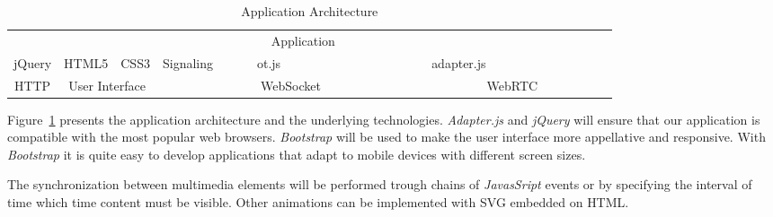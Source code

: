 \begin{table}[H]
\centering
	\caption{Application Architecture}
	\label{table:apparch}
    \begin{tabular}{cccccccc@{}m{0pt}@{}}
	\hline 
\multicolumn{8}{|c|}{\cellcolor{Gray}Application}  &\\[12pt]\cline{1-5}\cline{7-7}
\multicolumn{1}{|c|}{jQuery} & \multicolumn{1}{c|}{HTML5} & \multicolumn{1}{c|}{CSS3} & \multicolumn{1}{c|}{Signaling} & \multicolumn{1}{c|}{~~~~~ot.js~~~~~} & \multicolumn{1}{c|}{\cellcolor{Gray}~~~~~~~~~~~~~~~} & \multicolumn{1}{c|}{adapter.js} &   \multicolumn{1}{c|}{\cellcolor{Gray}~~~~~~~~~~~~~~~} &\\[12pt]\hline
\multicolumn{1}{|c|}{HTTP} & \multicolumn{2}{c|}{User Interface}  & \multicolumn{3}{c|}{WebSocket}    & \multicolumn{2}{c|}{WebRTC}      &\\[12pt]\hline
\end{tabular}
	        \label{fig:apparch}
\end{table}

Figure~\ref{fig:apparch} presents the application architecture and the underlying technologies. \emph{Adapter.js} and \emph{jQuery} will ensure that our application is compatible with the most popular web browsers.
\emph{Bootstrap} will be used to make the user interface more appellative and responsive. With \emph{Bootstrap} it is quite easy to develop applications that adapt to mobile devices with different screen sizes.

The synchronization between multimedia elements will be performed trough chains of \emph{JavasSript} events or by specifying the interval of time which time content must be visible. Other animations can be implemented with \ac{SVG} embedded on \ac{HTML}.
